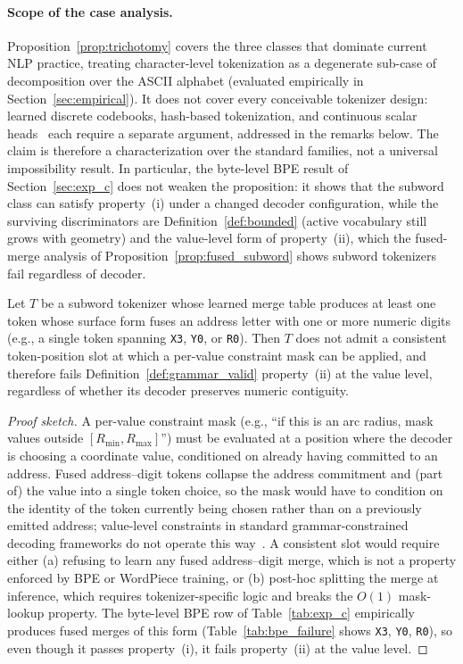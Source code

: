 \documentclass[sensors,article,submit,moreauthors,pdftex]{Definitions/mdpi}
\begin{document}
\paragraph{Scope of the case analysis.}
Proposition~\ref{prop:trichotomy} covers the three classes that dominate current NLP practice, treating character-level tokenization as a degenerate sub-case of decomposition over the ASCII alphabet (evaluated empirically in Section~\ref{sec:empirical}). It does not cover every conceivable tokenizer design: learned discrete codebooks, hash-based tokenization, and continuous scalar heads~\cite{xval} each require a separate argument, addressed in the remarks below. The claim is therefore a characterization over the standard families, not a universal impossibility result. In particular, the byte-level BPE result of Section~\ref{sec:exp_c} does not weaken the proposition: it shows that the subword class can satisfy property~(i) under a changed decoder configuration, while the surviving discriminators are Definition~\ref{def:bounded} (active vocabulary still grows with geometry) and the value-level form of property~(ii), which the fused-merge analysis of Proposition~\ref{prop:fused_subword} shows subword tokenizers fail regardless of decoder.

\begin{Proposition}
\label{prop:fused_subword}
Let $T$ be a subword tokenizer whose learned merge table produces at least one token whose surface form fuses an address letter with one or more numeric digits (e.g., a single token spanning \texttt{X3}, \texttt{Y0}, or \texttt{R0}). Then $T$ does not admit a consistent token-position slot at which a per-value constraint mask can be applied, and therefore fails Definition~\ref{def:grammar_valid} property~(ii) at the value level, regardless of whether its decoder preserves numeric contiguity.
\end{Proposition}

\begin{proof}[Proof sketch]
A per-value constraint mask (e.g., ``if this is an arc radius, mask values outside $[R_{\min}, R_{\max}]$'') must be evaluated at a position where the decoder is choosing a coordinate value, conditioned on already having committed to an address. Fused address--digit tokens collapse the address commitment and (part of) the value into a single token choice, so the mask would have to condition on the identity of the token currently being chosen rather than on a previously emitted address; value-level constraints in standard grammar-constrained decoding frameworks do not operate this way~\cite{outlines,xgrammar,picard}. A consistent slot would require either (a) refusing to learn any fused address--digit merge, which is not a property enforced by BPE or WordPiece training, or (b) post-hoc splitting the merge at inference, which requires tokenizer-specific logic and breaks the $O(1)$ mask-lookup property. The byte-level BPE row of Table~\ref{tab:exp_c} empirically produces fused merges of this form (Table~\ref{tab:bpe_failure} shows \texttt{X3}, \texttt{Y0}, \texttt{R0}), so even though it passes property~(i), it fails property~(ii) at the value level.
\end{proof}
\end{document}

